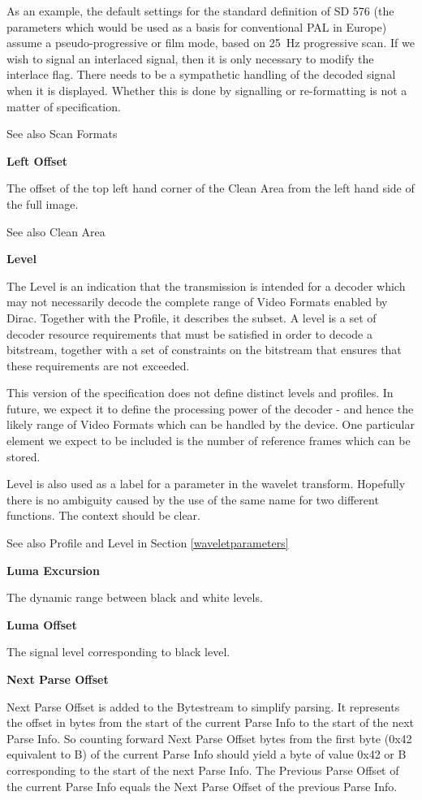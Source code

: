As an example, the default settings for the standard definition of SD
576 (the parameters which would be used as a basis for conventional PAL
in Europe) assume a pseudo-progressive or film mode, based on 25~Hz
progressive scan. If we wish to signal an interlaced signal, then it is
only necessary to modify the interlace flag. There needs to be a
sympathetic handling of the decoded signal when it is displayed. Whether
this is done by signalling or re-formatting is not a matter of
specification.

See also Scan Formats

\textbf{Left Offset}

The offset of the top left hand corner of the Clean Area from the left
hand side of the full image.

See also Clean Area

\textbf{Level}

The Level is an indication that the transmission is intended for a
decoder which may not necessarily decode the complete range of Video
Formats enabled by Dirac. Together with the Profile, it describes the
subset. A level is a set of decoder resource requirements that must be
satisfied in order to decode a bitstream, together with a set of
constraints on the bitstream that ensures that these requirements are
not exceeded.

This version of the specification does not define distinct levels and
profiles.  In future, we expect it to define the processing power of the
decoder - and hence the likely range of Video Formats which can be
handled by the device. One particular element we expect to be included
is the number of reference frames which can be stored.

Level is also used as a label for a parameter in the wavelet transform.
Hopefully there is no ambiguity caused by the use of the same name for
two different functions. The context should be clear.

See also Profile and Level in Section \ref{waveletparameters}

\textbf{Luma Excursion}

The dynamic range between black and white levels.

\textbf{Luma Offset}

The signal level corresponding to black level.

\textbf{Next Parse Offset }

Next Parse Offset is added to the Bytestream to simplify parsing. It
represents the offset in bytes from the start of the current Parse Info
to the start of the next Parse Info. So counting forward Next Parse
Offset bytes from the first byte (0x42 equivalent to B) of the current
Parse Info should yield a byte of value 0x42 or B corresponding to the
start of the next Parse Info. The Previous Parse Offset of the current
Parse Info equals the Next Parse Offset of the previous Parse Info.


